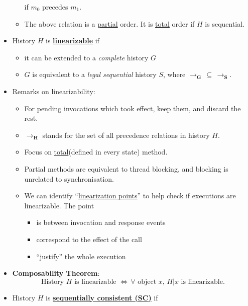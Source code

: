 \documentclass[twocolumn,landscape,10pt]{article}
\theoremstyle{definition}
\begin{document}
\begin{itemize}
\begin{itemize}
\[                \]
                if $m_0$ precedes $m_1$.
            \item The above relation is a \underline{partial} order. It is
                \underline{total} order if $H$ is sequential.
        \end{itemize} 
    \item History $H$ is \textbf{\underline{linearizable}} if
        \begin{itemize}
            \item it can be extended to a \emph{complete} history $G$
            \item $G$ is equivalent to a \emph{legal sequential} history $S$,
                where $\pmb{\rightarrow_G}\,\subseteq\,\pmb{\rightarrow_S}$.
        \end{itemize} 
    \item Remarks on linearizability:
        \begin{itemize}
            \item For pending invocations which took effect, keep them, and
                discard the rest.
            \item $\pmb{\rightarrow_H}$ stands for the set of all precedence
                relations in history $H$.
            \item Focus on \underline{total}(defined in every state) method.
            \item Partial methods are equivalent to thread blocking, and
                blocking is unrelated to synchronisation.
            \item We can identify ``\underline{linearization points}'' 
                to help check if executions are linearizable. The point
                \begin{itemize}
                    \item is between invocation and response events
                    \item correspond to the effect of the call
                    \item ``justify'' the whole execution
                \end{itemize} 
        \end{itemize} 
    \item \textbf{Composability Theorem}:
        \[
            \text{History $H$ is linearizable $\iff\,\forall$ object $x$, $H|x$ is
            linearizable.}
        \]
    \item History $H$ is \textbf{\underline{sequentially consistent (SC)}} if

\end{itemize}
\end{document}
